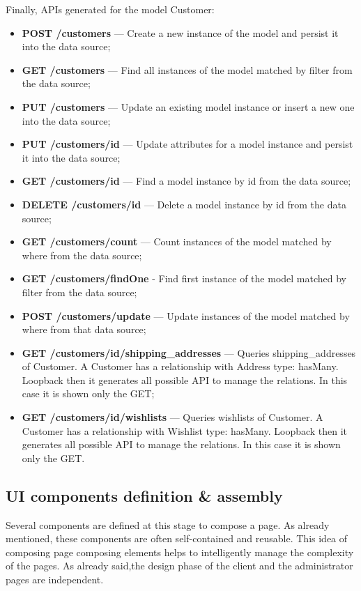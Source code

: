 Finally, APIs generated for the model Customer:
\begin{itemize}
\item \textbf{POST /customers} — Create a new instance of the model and persist it into the data source;
\item \textbf{GET /customers} —  Find all instances of the model matched by filter from the data source;
\item \textbf{PUT /customers} — Update an existing model instance or insert a new one into the data source;
\item \textbf{PUT /customers/id} — Update attributes for a model instance and persist it into the data source;
\item \textbf{GET /customers/id} — Find a model instance by id from the data source;
\item \textbf{DELETE /customers/id} — Delete a model instance by id from the data source;
\item \textbf{GET  /customers/count} — Count instances of the model matched by where from the data source;
\item \textbf{GET /customers/findOne}  - Find first instance of the model matched by filter from the data source;
\item \textbf{POST /customers/update} — Update instances of the model matched by where from that data source;
\item \textbf{GET /customers/id/shipping\_addresses} — Queries shipping\_addresses of Customer. A Customer has a relationship with Address type: hasMany. Loopback then it generates all possible API to manage the relations. In this case it is shown only the GET;
\item \textbf{GET  /customers/id/wishlists} — Queries wishlists of Customer. A Customer has a relationship with Wishlist type: hasMany. Loopback then it generates all possible API to manage the relations. In this case it is shown only the GET.
\end{itemize}
\subsection{UI components definition \& assembly}
Several components are defined at this stage to compose a page. As already mentioned, these components are often self-contained and reusable.
\newline
This idea of composing page composing elements helps to intelligently manage the complexity of the pages. As already said,the design phase of the client and the administrator pages are independent.
